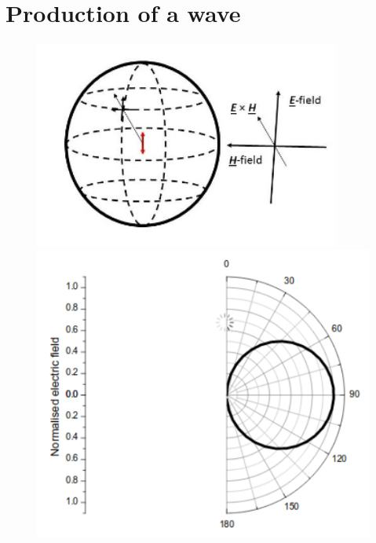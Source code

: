 \documentclass[a4paper, 11pt, normalem]{report}
\begin{document}
\section{Production of a wave}
\begin{figure}[H]
	\centering
	\includegraphics[scale=0.4]{bhmfield.png}
	\includegraphics[scale=0.4]{normtheta.png}
\end{figure}
\end{document}
